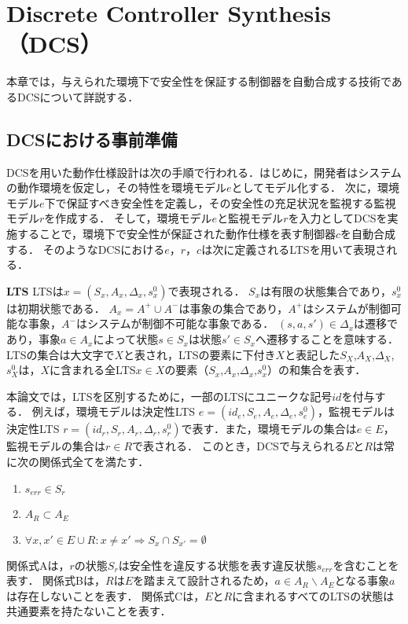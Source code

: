 \section{Discrete Controller Synthesis（DCS）}
\label{section:DCS}
本章では，与えられた環境下で安全性を保証する制御器を自動合成する技術であるDCSについて詳説する．

\subsection{DCSにおける事前準備}
\label{subsection:preparation}
DCSを用いた動作仕様設計は次の手順で行われる．はじめに，開発者はシステムの動作環境を仮定し，その特性を環境モデル$e$としてモデル化する．
次に，環境モデル$e$下で保証すべき安全性を定義し，その安全性の充足状況を監視する監視モデル$r$を作成する．
そして，環境モデル$e$と監視モデル$r$を入力としてDCSを実施することで，環境下で安全性が保証された動作仕様を表す制御器$c$を自動合成する．
そのようなDCSにおける$e$，$r$，$c$は次に定義されるLTSを用いて表現される．

\begin{dfn}{\textbf{LTS}}
\label{def:component_model}
    LTSは$x = (S_{x}, A_{x}, \Delta_{x}, s^0_{x})$で表現される．
    $S_{x}$は有限の状態集合であり，$s^0_{x}$は初期状態である．
    $A_{x} = A^+ \cup A^-$は事象の集合であり，$A^+$はシステムが制御可能な事象，$A^-$はシステムが制御不可能な事象である．
    $(s,a,s') \in \Delta_{x}$は遷移であり，事象$a \in A_{x}$によって状態$s \in S_{x}$は状態$s' \in S_{x}$へ遷移することを意味する．
    LTSの集合は大文字で$X$と表され，LTSの要素に下付き$X$と表記した$S_{X}$,$A_{X}$,$\Delta_{X}$,$s^0_{X}$は，$X$に含まれる全LTS$x \in X$の要素（$S_{x}$,$A_{x}$,$\Delta_{x}$,$s^0_{x}$）の和集合を表す．
\end{dfn}

本論文では，LTSを区別するために，一部のLTSにユニークな記号$id$を付与する．
例えば，環境モデルは決定性LTS $e = (id_{e}, S_{e}, A_{e}, \Delta_{e}, s^0_{e})$，監視モデルは決定性LTS $r = (id_{r}, S_{r}, A_{r}, \Delta_{r}, s^0_{r})$で表す．また，環境モデルの集合は$e \in E$，監視モデルの集合は$r \in R$で表される．
このとき，DCSで与えられる$E$と$R$は常に次の関係式全てを満たす．
\begin{enumerate}[\bf 関係式A]
\item $s_{err} \in S_{r}$
\item $A_{R} \subset A_{E}$
\item $\forall x, x' \in E \cup R:  x \neq x'  \Rightarrow S_x \cap S_{x'} = \emptyset$
\end{enumerate}
関係式Aは，$r$の状態$S_{r}$は安全性を違反する状態を表す違反状態$s_{err}$を含むことを表す．
関係式Bは，$R$は$E$を踏まえて設計されるため，$a \in A_{R} \backslash A_{E}$となる事象$a$は存在しないことを表す．
関係式Cは，$E$と$R$に含まれるすべてのLTSの状態は共通要素を持たないことを表す．

